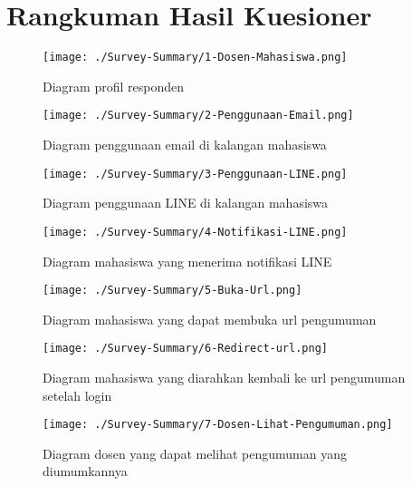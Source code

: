 \section{Rangkuman Hasil Kuesioner}
\label{sec:summary-result-survey}

\begin{figure}[H]
	\centering  
	\texttt{[image: ./Survey-Summary/1-Dosen-Mahasiswa.png]}
	\caption[Diagram profil responden]{Diagram profil responden} 
	\label{fig:summary-1-Dosen-Mahasiswa} 
\end{figure}

\begin{figure}[H]
	\centering  
	\texttt{[image: ./Survey-Summary/2-Penggunaan-Email.png]}
	\caption[Diagram penggunaan email di kalangan mahasiswa]{Diagram penggunaan email di kalangan mahasiswa} 
	\label{fig:summary-2-Penggunaan-Email} 
\end{figure}

\begin{figure}[H]
	\centering  
	\texttt{[image: ./Survey-Summary/3-Penggunaan-LINE.png]}
	\caption[Diagram penggunaan LINE di kalangan mahasiswa]{Diagram penggunaan LINE di kalangan mahasiswa} 
	\label{fig:summary-3-Penggunaan-LINE} 
\end{figure}

\begin{figure}[H]
	\centering  
	\texttt{[image: ./Survey-Summary/4-Notifikasi-LINE.png]}
	\caption[Diagram mahasiswa yang menerima notifikasi LINE]{Diagram mahasiswa yang menerima notifikasi LINE} 
	\label{fig:summary-4-Notifikasi-LINE} 
\end{figure}

\begin{figure}[H]
	\centering  
	\texttt{[image: ./Survey-Summary/5-Buka-Url.png]}
	\caption[Diagram mahasiswa yang dapat membuka url pengumuman]{Diagram mahasiswa yang dapat membuka url pengumuman} 
	\label{fig:summary-5-Buka-Url} 
\end{figure}

\begin{figure}[H]
	\centering  
	\texttt{[image: ./Survey-Summary/6-Redirect-url.png]}
	\caption[Diagram mahasiswa yang diarahkan kembali ke url pengumuman setelah login]{Diagram mahasiswa yang diarahkan kembali ke url pengumuman setelah login} 
	\label{fig:summary-6-Redirect-url} 
\end{figure}

\begin{figure}[H]
	\centering  
	\texttt{[image: ./Survey-Summary/7-Dosen-Lihat-Pengumuman.png]}
	\caption[Diagram dosen yang dapat melihat pengumuman yang diumumkannya]{Diagram dosen yang dapat melihat pengumuman yang diumumkannya} 
	\label{fig:summary-7-Dosen-Lihat-Pengumuman} 
\end{figure}

